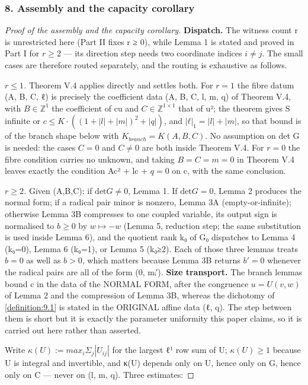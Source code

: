 \documentclass[11pt]{article}
\theoremstyle{plain}
\theoremstyle{definition}
\theoremstyle{remark}
\theoremstyle{plain}
\theoremstyle{definition}
\theoremstyle{remark}
\newcounter{Part}
\theoremstyle{plain}
\theoremstyle{definition}
\theoremstyle{remark}
\begin{document}
\subsubsection*{8. Assembly and the capacity corollary}
\begin{proof}[Proof of the assembly and the capacity corollary]
\textbf{Dispatch.} The witness count r is unrestricted here (Part II fixes r ≥ 0), while Lemma 1 is stated and proved in Part I for $r ≥ 2$ — its direction step needs two coordinate indices $i ≠ j$. The small cases are therefore routed separately, and the routing is exhaustive as follows.

\emph{$r ≤ 1$.} Theorem V.4 applies directly and settles both. For $r = 1$ the fibre datum (A, B, C, ℓ) is precisely the coefficient data (A, B, C, l, m, q) of Theorem V.4, with $B ∈ ℤ^{1}$ the coefficient of cu and $C ∈ ℤ^{1×1}$ that of u²; the theorem gives S infinite or $c ≤ K·((1+|l|+|m|)^{2} + |q|)$, and $|ℓ|_{1} = |l|+|m|$, so that bound is of the branch shape below with $K_{branch} = K(A,B,C)$. No assumption on det G is needed: the cases $C = 0$ and $C ≠ 0$ are both inside Theorem V.4. For $r = 0$ the fibre condition carries no unknown, and taking $B = C = m = 0$ in Theorem V.4 leaves exactly the condition Ac² + lc + $q = 0$ on c, with the same conclusion.

\emph{$r ≥ 2$.} Given (A,B,C): if $\mathrm{det} G ≠ 0$, Lemma 1. If $\mathrm{det} G = 0$, Lemma 2 produces the normal form; if a radical pair minor is nonzero, Lemma 3A (empty-or-infinite); otherwise Lemma 3B compresses to one coupled variable, its output sign is normalised to $b ≥ 0$ by $w ↦ −w$ (Lemma 5, reduction step; the same substitution is used inside Lemma 6), and the quotient rank k₀ of G₀ dispatches to Lemma 4 (k₀=0), Lemma 6 (k₀=1), or Lemma 5 (k₀≥2). Each of those three lemmas treats $b = 0$ as well as $b > 0$, which matters because Lemma 3B returns $b′ = 0$ whenever the radical pairs are all of the form (0, mᵢ′). \textbf{Size transport.} The branch lemmas bound c in the data of the NORMAL FORM, after the congruence $u = U(v,w)$ of Lemma 2 and the compression of Lemma 3B, whereas the dichotomy of \cref{definition:9.1} is stated in the ORIGINAL affine data (ℓ, q). The step between them is short but it is exactly the parameter uniformity this paper claims, so it is carried out here rather than asserted.

Write $κ(U) := max_{i} Σ_{j} |U_{ij}|$ for the largest ℓ¹ row sum of U; $κ(U) ≥ 1$ because U is integral and invertible, and κ(U) depends only on U, hence only on G, hence only on C — never on (l, m, q). Three estimates:


\end{proof}
\end{document}
